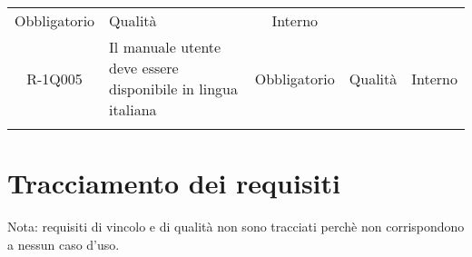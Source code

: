 \begin{tabularx}{\textwidth}{cXccc}
	Obbligatorio &
	
	Qualità &
	
	Interno \\
	R-1Q005 &
	
	Il manuale utente deve essere disponibile in lingua italiana   &
	
	Obbligatorio &
	
	Qualità &
	
	Interno \\
	
	\rowcolor{white}
	\caption{Tabella requisiti di qualità} \label{tab:tabellarequisitiqualità}
\end{tabularx}


\section{Tracciamento dei requisiti}
Nota: requisiti di vincolo e di qualità non sono tracciati perchè non corrispondono a nessun caso d'uso.
